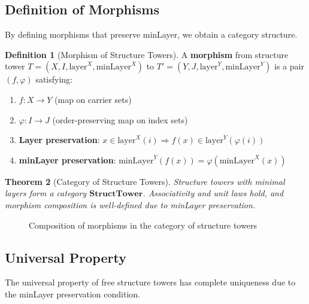 \documentclass[11pt,a4paper]{article}
\theoremstyle{plain}
\newtheorem{theorem}{Theorem}[section]
\theoremstyle{definition}
\newtheorem{definition}[theorem]{Definition}
\newcommand{\StructTower}{\mathbf{StructTower}}
\newcommand{\minmark}{\mathrm{minLayer}}
\newcommand{\layer}{\mathrm{layer}}
\begin{document}
\subsection{Definition of Morphisms}

By defining morphisms that preserve minLayer, we obtain a category structure.

\begin{definition}[Morphism of Structure Towers]
\label{def:tower-morphism}
A \textbf{morphism} from structure tower $T = (X, I, \layer^X, \minmark^X)$ to 
$T' = (Y, J, \layer^Y, \minmark^Y)$ is a pair $(f, \varphi)$ satisfying:
\begin{enumerate}[label=(\arabic*)]
  \item $f : X \to Y$ (map on carrier sets)
  \item $\varphi : I \to J$ (order-preserving map on index sets)
  \item \textbf{Layer preservation}: $x \in \layer^X(i) \Rightarrow f(x) \in \layer^Y(\varphi(i))$
  \item \textbf{minLayer preservation}: $\minmark^Y(f(x)) = \varphi(\minmark^X(x))$
\end{enumerate}
\end{definition}

\begin{theorem}[Category of Structure Towers]
\label{thm:tower-category}
Structure towers with minimal layers form a category $\StructTower$.
Associativity and unit laws hold, and morphism composition is well-defined 
due to minLayer preservation.
\end{theorem}

\begin{figure}[htbp]
\centering
{}
\caption{Composition of morphisms in the category of structure towers}
\label{fig:category-composition}
\end{figure}

\subsection{Universal Property}

The universal property of free structure towers has complete uniqueness 
due to the minLayer preservation condition.
\end{document}
